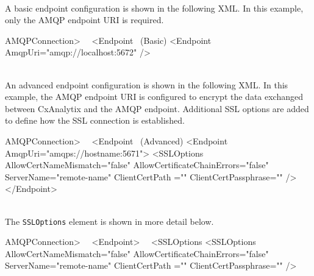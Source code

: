 \noindent\\A basic endpoint configuration is shown in the following XML.  In this example, only the AMQP endpoint URI is required.\\

\begin{xml}{AMQPConnection> \ \faArrowLeft \ <Endpoint}{\expandsenv\encrypts}{ \ (Basic)}
<Endpoint AmqpUri="amqp://localhost:5672" />
\end{xml}


\noindent\\An advanced endpoint configuration is shown in the following XML.  In this example, the AMQP endpoint URI is
configured to encrypt the data exchanged between CxAnalytix and the AMQP endpoint.  Additional SSL options are added to define how
the SSL connection is established.\\

\begin{xml}{AMQPConnection> \ \faArrowLeft \ <Endpoint}{\expandsenv\encrypts}{ \ (Advanced)}
<Endpoint
    AmqpUri="amqps://hostname:5671">
    <SSLOptions 
        AllowCertNameMismatch="false" 
        AllowCertificateChainErrors="false" 
        ServerName="remote-name" 
        ClientCertPath ="" 
        ClientCertPassphrase=""
        />
</Endpoint>
\end{xml}
    

\noindent\\The \texttt{SSLOptions} element is shown in more detail below.

\begin{xml}{AMQPConnection> \ \faArrowLeft \ <Endpoint> \ \faArrowLeft \ <SSLOptions}{\expandsenv\encrypts}{}
<SSLOptions 
    AllowCertNameMismatch="false" 
    AllowCertificateChainErrors="false" 
    ServerName="remote-name" 
    ClientCertPath ="" 
    ClientCertPassphrase=""
    />
\end{xml}
    
